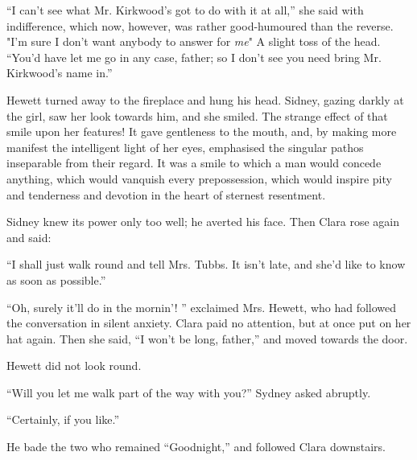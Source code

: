``I can't see what Mr. Kirkwood's got to do with it at all,'' she said
with indifference, which now, however, was rather good-humoured than the
reverse. "I'm sure I don't want anybody to answer for \emph{me}" A
slight toss of the head. ``You'd have let me go in any case, father; so
I don't see you need bring Mr. Kirkwood's name in.''

Hewett turned away to the fireplace and hung his head. Sidney, gazing
darkly at the girl, saw her look towards him, and she smiled. The
strange effect of that smile upon her features! It gave gentleness to
the mouth, and, by making more manifest the intelligent light of her
eyes, emphasised the singular pathos inseparable from their regard. It
was a smile to which a man would concede anything, which would vanquish
every prepossession, which would inspire pity and tenderness and
devotion in the heart of sternest resentment.

Sidney knew its power only too well; he
{\protect\hypertarget{70}{}{}}averted his face. Then Clara rose again
and said:

``I shall just walk round and tell Mrs. Tubbs. It isn't late, and she'd
like to know as soon as possible.''

``Oh, surely it'll do in the mornin'! '' exclaimed Mrs. Hewett, who had
followed the conversation in silent anxiety. Clara paid no attention,
but at once put on her hat again. Then she said, ``I won't be long,
father,'' and moved towards the door.

Hewett did not look round.

``Will you let me walk part of the way with you?'' Sydney asked
abruptly.

``Certainly, if you like.''

He bade the two who remained ``Goodnight,'' and followed Clara
downstairs.
